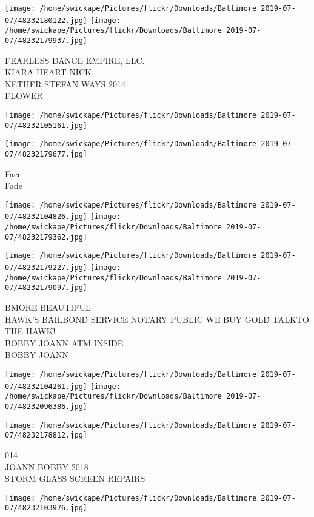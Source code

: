 \documentclass[10pt,letterpaper]{article}
\begin{document}
\texttt{[image: /home/swickape/Pictures/flickr/Downloads/Baltimore 2019-07-07/48232180122.jpg]}
\texttt{[image: /home/swickape/Pictures/flickr/Downloads/Baltimore 2019-07-07/48232179937.jpg]}

FEARLESS DANCE EMPIRE, LLC.\\
KIARA HEART NICK\\
NETHER STEFAN WAYS 2014\\
FLOWER
\pagebreak

\texttt{[image: /home/swickape/Pictures/flickr/Downloads/Baltimore 2019-07-07/48232105161.jpg]}

\vspace{0.25in}
\texttt{[image: /home/swickape/Pictures/flickr/Downloads/Baltimore 2019-07-07/48232179677.jpg]}

Face\\
Fade
\pagebreak

\texttt{[image: /home/swickape/Pictures/flickr/Downloads/Baltimore 2019-07-07/48232104826.jpg]}
\texttt{[image: /home/swickape/Pictures/flickr/Downloads/Baltimore 2019-07-07/48232179362.jpg]}

\texttt{[image: /home/swickape/Pictures/flickr/Downloads/Baltimore 2019-07-07/48232179227.jpg]}
\texttt{[image: /home/swickape/Pictures/flickr/Downloads/Baltimore 2019-07-07/48232179097.jpg]}

BMORE BEAUTIFUL\\
HAWK'S BAILBOND SERVICE NOTARY PUBLIC WE BUY GOLD TALKTO THE HAWK!\\
BOBBY JOANN ATM INSIDE\\
BOBBY JOANN
\pagebreak

\texttt{[image: /home/swickape/Pictures/flickr/Downloads/Baltimore 2019-07-07/48232104261.jpg]}
\texttt{[image: /home/swickape/Pictures/flickr/Downloads/Baltimore 2019-07-07/48232096386.jpg]}

\vspace{0.25in}
\texttt{[image: /home/swickape/Pictures/flickr/Downloads/Baltimore 2019-07-07/48232178812.jpg]}

014\\
JOANN BOBBY 2018\\
STORM GLASS SCREEN REPAIRS
\pagebreak

\texttt{[image: /home/swickape/Pictures/flickr/Downloads/Baltimore 2019-07-07/48232103976.jpg]}
\end{document}
